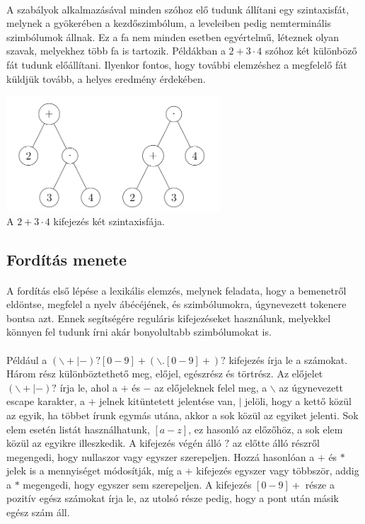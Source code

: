 \documentclass[12pt]{report}
\begin{document}
\paragraph{}
A szabályok alkalmazásával minden szóhoz elő tudunk állítani egy szintaxisfát, melynek a gyökerében a kezdőszimbólum, a leveleiben pedig nemterminális szimbólumok állnak. Ez a fa nem minden esetben egyértelmű, léteznek olyan szavak, melyekhez több fa is tartozik. Példákban a $2+3\cdot4$ szóhoz két különböző fát tudunk előállítani. Ilyenkor fontos, hogy további elemzéshez a megfelelő fát küldjük tovább, a helyes eredmény érdekében.
\begin{center}
\includegraphics[width=8cm]{pics/syntax_tree}\\
{\footnotesize A $2+3\cdot4$ kifejezés két szintaxisfája.}
\end{center}

\subsection{Fordítás menete}
\paragraph{}
A fordítás első lépése a lexikális elemzés, melynek feladata, hogy a bemenetről eldöntse, megfelel a nyelv ábécéjének, és szimbólumokra, úgynevezett tokenere bontsa azt. Ennek segítségére reguláris kifejezéseket használunk, melyekkel könnyen fel tudunk írni akár bonyolultabb szimbólumokat is.
\paragraph{}
Például a $(\backslash +|-)?[0-9]+(\backslash.[0-9]+)?$ kifejezés írja le a számokat. Három rész különböztethető meg, előjel, egészrész és törtrész. Az előjelet $(\backslash+|-)?$ írja le, ahol a $+$ és $-$ az előjeleknek felel meg, a $\backslash$ az úgynevezett escape karakter, a $+$ jelnek kitüntetett jelentése van, $|$ jelöli, hogy a kettő közül az egyik, ha többet írunk egymás utána, akkor a sok közül az egyiket jelenti. Sok elem esetén listát használhatunk, $[a-z]$, ez hasonló az előzőhöz, a sok elem közül az egyikre illeszkedik. A kifejezés végén álló $?$ az előtte álló részről megengedi, hogy nullaszor vagy egyszer szerepeljen. Hozzá hasonlóan a $+$ és $*$ jelek is a mennyiséget módosítják, míg a $+$ kifejezés egyszer vagy többször, addig a $*$ megengedi, hogy egyszer sem szerepeljen. A kifejezés $[0-9]+$ része a pozitív egész számokat írja le, az utolsó része pedig, hogy a pont után másik egész szám áll.
\end{document}
